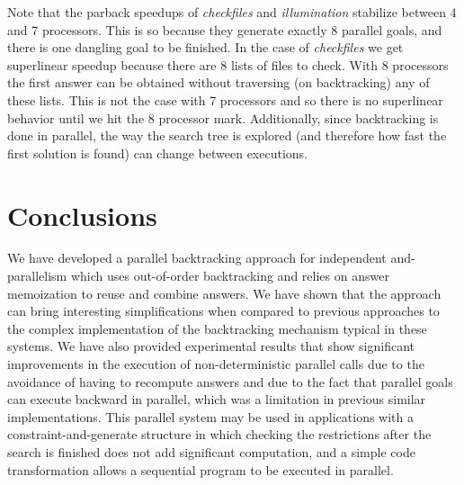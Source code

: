 \documentclass{tlp}
\newcounter{mnotei} \setcounter{mnotei}{0}
\newcommand{\mnote}[1]{{\scriptsize\textsf{\textcolor{blue}{}}}\marginpar{\scriptsize\textsf{\textcolor{red}{n.\themnotei: #1}}}\stepcounter{mnotei} }
\renewcommand{\mnote}[1]{}
\newcommand{\compressection}{\vspace{-1em}}
\begin{document}
Note that the \textsf{parback} speedups of \emph{checkfiles} and
\emph{illumination} stabilize between 4 and 7 processors.  This is so
because they generate exactly 8 parallel goals, and there is one
dangling goal to be finished.  In the case of \emph{checkfiles} we get
superlinear speedup because there are 8 lists of files to check.  With
8 processors the first answer can be obtained without traversing (on
backtracking) any of these lists.  This is not the case with 7
processors 
and so there is no superlinear behavior until we hit the
8 processor mark.  
Additionally, since backtracking is done in parallel, the way the
search tree is explored (and therefore how fast the first solution is
found) can change between executions.





\compressection
\section{Conclusions}
\label{sec:conclusions}

We have developed a parallel backtracking approach for independent
and-paral\-lelism which uses out-of-order backtracking and relies on
answer memoization to reuse and combine answers. We have shown that
the approach can bring interesting simplifications when compared to
previous approaches to the complex implementation of the backtracking
mechanism typical in these systems. 
We have also provided experimental results that show significant
improvements in the execution of non-deterministic parallel calls due
to the avoidance of having to recompute answers and due to the fact
that parallel goals can execute backward in parallel, which was a
limitation in previous similar implementations. This parallel system
may be used in
applications
with a
constraint-and-generate
structure in which checking the
restrictions after the search is finished does not add significant
computation, and a simple code transformation allows a sequential
program to be executed in parallel.\mnote{But in general moving the
  checking after the generation greatly decreases performance to start
  with.  The cases in which this is not so can be very scarce.}






\end{document}
